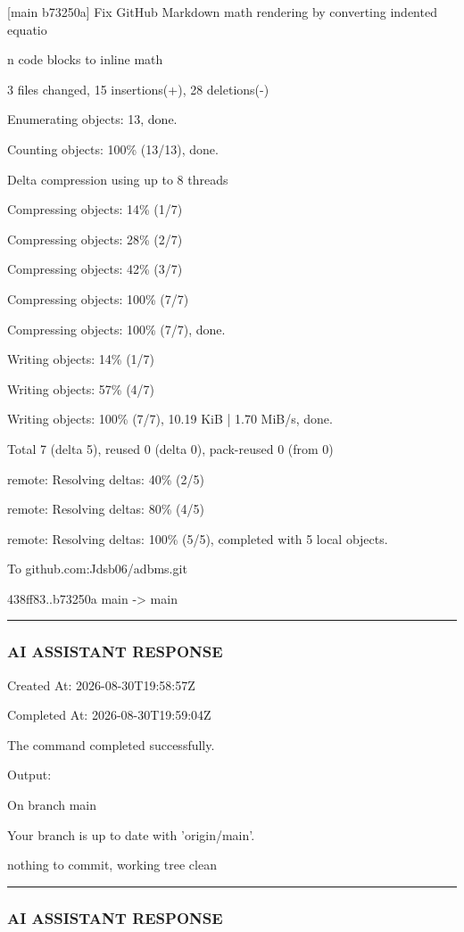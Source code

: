 \documentclass[11pt,a4paper]{article}
\begin{document}
{[main b73250a] Fix GitHub Markdown math rendering by converting indented equatio

n code blocks to inline math

3 files changed, 15 insertions(+), 28 deletions(-)

Enumerating objects: 13, done.

Counting objects: 100\% (13/13), done.

Delta compression using up to 8 threads

Compressing objects:  14\% (1/7)

Compressing objects:  28\% (2/7)

Compressing objects:  42\% (3/7)

Compressing objects: 100\% (7/7)

Compressing objects: 100\% (7/7), done.

Writing objects:  14\% (1/7)

Writing objects:  57\% (4/7)

Writing objects: 100\% (7/7), 10.19 KiB | 1.70 MiB/s, done.

Total 7 (delta 5), reused 0 (delta 0), pack-reused 0 (from 0)

remote: Resolving deltas:  40\% (2/5)

remote: Resolving deltas:  80\% (4/5)

remote: Resolving deltas: 100\% (5/5), completed with 5 local objects.

To github.com:Jdsb06/adbms.git

438ff83..b73250a  main -> main


\hrule

\subsubsection{AI ASSISTANT RESPONSE}

Created At: 2026-08-30T19:58:57Z

Completed At: 2026-08-30T19:59:04Z


The command completed successfully.

Output:

On branch main

Your branch is up to date with 'origin/main'.


nothing to commit, working tree clean


\hrule

\subsubsection{AI ASSISTANT RESPONSE}

}
\end{document}
